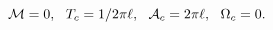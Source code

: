 \begin{equation}
{\cal M}=0,~~T_c = 1 / 2 \pi \ell,
~~{\cal A}_c = 2 \pi \ell,
~~\Omega_c =0.
\label{tempd}
\end{equation}

